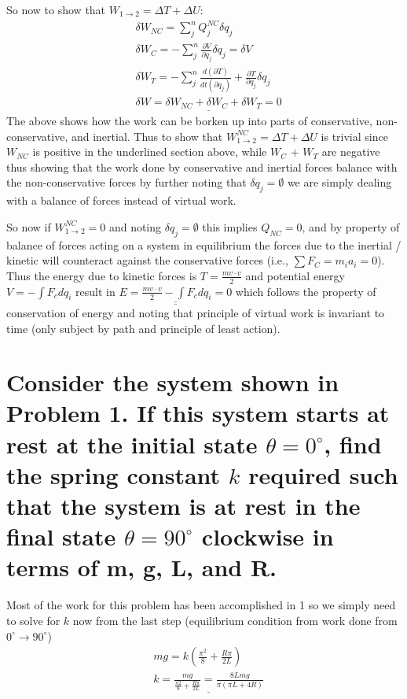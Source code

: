 \documentclass{article}
\begin{document}
So now to show that $W_{1 \to 2} = \Delta T + \Delta U$:
\begin{align*}
    & \delta W_{NC} = \sum_j^n Q_j^{NC} \delta q_j \\
    & \delta W_{C} = -\sum_j^n \frac{\partial V}{\partial q_j} \delta q_j = \delta V \\
    & \delta W_{T} = -\sum_j^n \frac{d(\partial T)}{dt(\partial \dot{q}_j)} + \frac{\partial T}{\partial q_j} \delta q_j \\
    & \underline{\delta W = \delta W_{NC} + \delta W_{C} + \delta W_{T} = 0}
\end{align*}
The above shows how the work can be borken up into parts of conservative, non-conservative, and inertial. Thus to show that $W_{1 \to 2}^{NC} = \Delta T + \Delta U$ is trivial since $W_{NC}$ is positive in the underlined section above, while $W_{C}$ + ${W_T}$ are negative thus showing that the work done by conservative and inertial forces balance with the non-conservative forces by further noting that $\delta q_j = \emptyset$ we are simply dealing with a balance of forces instead of virtual work.

So now if $W_{1 \to 2}^{NC} = 0$ and noting $\delta q_j = \emptyset$ this implies $Q_{NC} = 0$, and by property of balance of forces acting on a system in equilibrium the forces due to the inertial / kinetic will counteract against the conservative forces (i.e., $\sum F_C = m_i a_i = 0$). Thus the energy due to kinetic forces is $T = \frac{m v \cdot v}{2}$ and potential energy $V = -\int F_c dq_i$ result in $\underline{\underline{E = \frac{m v \cdot v}{2} - \int F_c dq_i = 0}}$ which follows the property of conservation of energy and noting that principle of virtual work is invariant to time (only subject by path and principle of least action).

\section{Consider the system shown in Problem 1. If this system starts at rest at the initial state $\theta = 0^\circ$, find the spring constant $k$ required such that the system is at rest in the final state $\theta = 90^{\circ}$ clockwise in terms of m, g, L, and R.}

Most of the work for this problem has been accomplished in 1 so we simply need to solve for $k$ now from the last step (equilibrium condition from work done from $0^\circ \to 90^\circ$)
\begin{align*}
    & mg = k(\frac{\pi^2}{8} + \frac{R \pi}{2 L}) \\
    & \underline{k = \frac{mg}{\frac{\pi2}{8} + \frac{R\pi}{2L}} = \frac{8 L mg}{\pi(\pi L + 4 R)}}
\end{align*}
\end{document}

